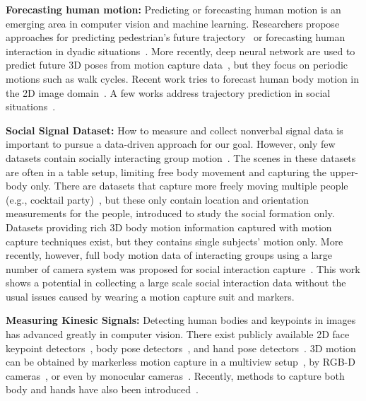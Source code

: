 \textbf{Forecasting human motion:}
Predicting or forecasting human motion is an emerging area in computer vision and machine learning. Researchers propose approaches for predicting pedestrian's future trajectory~\cite{kitani2012activity} or forecasting human interaction in dyadic situations~\cite{huang2014action}. More recently, deep neural network are used to predict future 3D poses from motion capture data~\cite{mnih2012conditional, Fragkiadaki_2015_ICCV, jain2016structural}, but they focus on periodic motions such as walk cycles. Recent work tries to forecast human body motion in the 2D image domain~\cite{walker2016uncertain, villegas2017learning}. A few works address trajectory prediction in social situations~\cite{helbing1995social, alahi2016social, gupta2018social}. 


\textbf{Social Signal Dataset:}
How to measure and collect nonverbal signal data is important to pursue a data-driven approach for our goal. However, only few datasets contain socially interacting group motion~\cite{alameda2016salsa, mccowan2005ami, lepri2012connecting, rehg2013decoding}. The scenes in these datasets are often in a table setup, limiting free body movement and capturing the upper-body only. There are datasets that capture more freely moving multiple people (e.g., cocktail party)~\cite{Zen-10, Cristani-11, farenzena2009social}, but these only contain location and orientation measurements for the people, introduced to study the social formation only. Datasets providing rich 3D body motion information captured with motion capture techniques exist, but they contains single subjects' motion only\cite{gross2001cmu, h36m_pami, sigal2010humaneva}. More recently, however, full body motion data of interacting groups using a large number of camera system was proposed for social interaction capture~\cite{Joo-15}. This work shows a potential in collecting a large scale social interaction data without the usual issues caused by wearing a motion capture suit and markers.

\textbf{Measuring Kinesic Signals:} Detecting human bodies and keypoints in images has advanced greatly in computer vision. There exist publicly available 2D face keypoint detectors~\cite{baltruvsaitis2016openface}, body pose detectors~\cite{cao2017realtime, Wei2016, Newell-16}, and hand pose detectors~\cite{simon2017hand}. 3D motion can be obtained by markerless motion capture in a multiview setup~\cite{Gall-09,Liu-2013,Elhayek-15, joo2017panoptic, joo2018}, by RGB-D cameras~\cite{Shotton2011,Baak2011}, or even by monocular cameras~\cite{Ramakrishna2012,Bogo2016,martinez2017simple,zhou2017towards,Moreno-noguer2017,mehta2017monocular}. Recently, methods to capture both body and hands have also been introduced~\cite{MANO:SIGGRAPHASIA:2017,joo2018}. 

